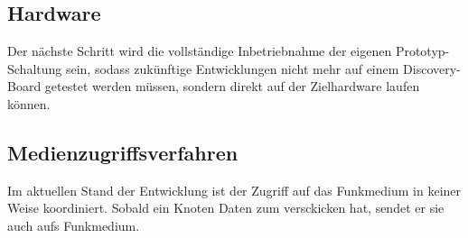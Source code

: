 \documentclass{IEEEtran}
\begin{document}
    \subsection{Hardware}
        Der nächste Schritt wird die vollständige Inbetriebnahme der eigenen
        Prototyp-Schaltung sein, sodass zukünftige Entwicklungen nicht mehr
        auf einem Discovery-Board getestet werden müssen, sondern direkt auf
        der Zielhardware laufen können.

    \subsection{Medienzugriffsverfahren}
    Im aktuellen Stand der Entwicklung ist der Zugriff auf das Funkmedium in keiner Weise koordiniert. Sobald ein Knoten Daten zum versckicken hat, sendet er sie auch aufs Funkmedium. 
\end{document}
